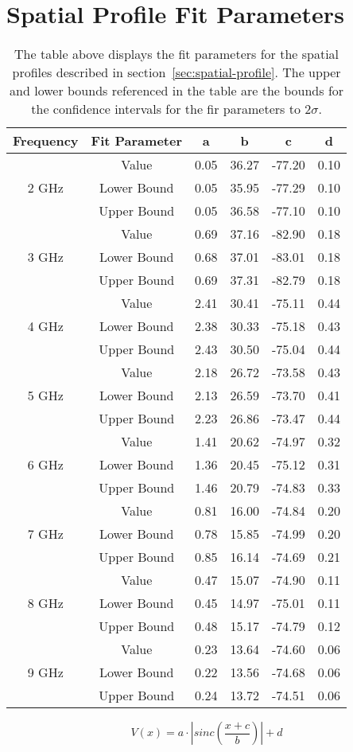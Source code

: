 \chapter{Spatial Profile Fit Parameters}
\label{app:spatial-fit-params}
	\def\arraystretch{1}
	\begin{table*}[!h]
		\centering
			\begin{tabular}{||c | c || c c c c||}
				\hline
				Frequency & Fit Parameter & a & b & c & d \\ [0.5ex]
				\hline\hline
				\multirow{3}{4em}{2 GHz} & Value & 0.05 & 36.27 & -77.20 & 0.10	 \\
				& Lower Bound & 0.05 & 35.95 & -77.29 & 0.10 \\
				& Upper Bound & 0.05 & 36.58 & -77.10 & 0.10 \\
				\hline
				\multirow{3}{4em}{3 GHz} & Value & 0.69 & 37.16 & -82.90 & 0.18  \\
				& Lower Bound & 0.68 & 37.01 & -83.01 & 0.18 \\
				& Upper Bound & 0.69 & 37.31 & -82.79 & 0.18 \\
				\hline
				\multirow{3}{4em}{4 GHz} & Value & 2.41 & 30.41 & -75.11 & 0.44 \\
				& Lower Bound & 2.38 & 30.33 & -75.18 & 0.43 \\
				& Upper Bound & 2.43 & 30.50 & -75.04 & 0.44 \\
				\hline
				\multirow{3}{4em}{5 GHz} & Value & 2.18 & 26.72 & -73.58 & 0.43 \\
				& Lower Bound & 2.13 & 26.59 & -73.70 & 0.41 \\
				& Upper Bound & 2.23 & 26.86 & -73.47 & 0.44 \\
				\hline
				\multirow{3}{4em}{6 GHz} & Value & 1.41 & 20.62 & -74.97 & 0.32 \\
				& Lower Bound & 1.36 & 20.45 & -75.12 & 0.31 \\
				& Upper Bound & 1.46 & 20.79 & -74.83 & 0.33 \\
				\hline
				\multirow{3}{4em}{7 GHz} & Value & 0.81 & 16.00 & -74.84 & 0.20 \\
				& Lower Bound & 0.78 & 15.85 & -74.99 & 0.20 \\
				& Upper Bound & 0.85 & 16.14 & -74.69 & 0.21 \\
				\hline
				\multirow{3}{4em}{8 GHz} & Value & 0.47 & 15.07 & -74.90 & 0.11 \\
				& Lower Bound & 0.45 & 14.97 & -75.01 & 0.11 \\
				& Upper Bound & 0.48 & 15.17 & -74.79 & 0.12 \\
				\hline
				\multirow{3}{4em}{9 GHz} & Value & 0.23 & 13.64 & -74.60 & 0.06 \\
				& Lower Bound & 0.22 & 13.56 & -74.68 & 0.06 \\
				& Upper Bound & 0.24 & 13.72 & -74.51 & 0.06 \\
				\hline
			\end{tabular}
			\caption[Spatial Profile Fit Parameters]{The table above displays the fit parameters for the spatial profiles described in section~\ref{sec:spatial-profile}. The upper and lower bounds referenced in the table are the bounds for the confidence intervals for the fir parameters to $2\sigma$.}
		\end{table*}
\begin{equation}
\label{eq:vxrestate}
V(x) = a\cdot |sinc\left(\frac{x+c}{b}\right)| + d
\end{equation}
\clearpage
\newpage
